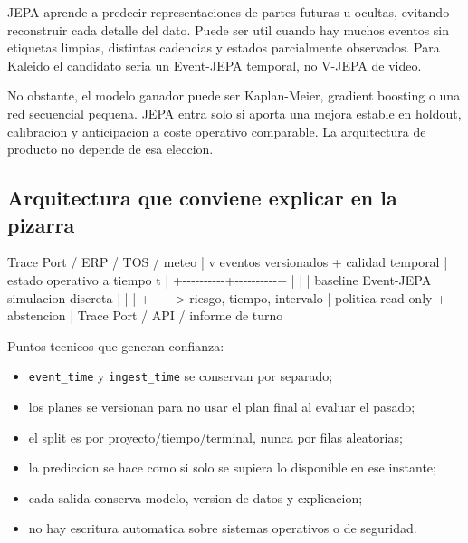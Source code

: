 \documentclass[
  spanish,
  10pt,
  a4paper,
]{article}
\newenvironment{Shaded}{}{}
\newcommand{\NormalTok}[1]{#1}
\providecommand{\tightlist}{%
  \setlength{\itemsep}{0pt}\setlength{\parskip}{0pt}}
\begin{document}
JEPA aprende a predecir representaciones de partes futuras u ocultas,
evitando reconstruir cada detalle del dato. Puede ser util cuando hay
muchos eventos sin etiquetas limpias, distintas cadencias y estados
parcialmente observados. Para Kaleido el candidato seria un Event-JEPA
temporal, no V-JEPA de video.

No obstante, el modelo ganador puede ser Kaplan-Meier, gradient boosting
o una red secuencial pequena. JEPA entra solo si aporta una mejora
estable en holdout, calibracion y anticipacion a coste operativo
comparable. La arquitectura de producto no depende de esa eleccion.

\subsection{Arquitectura que conviene explicar en la
pizarra}\label{arquitectura-que-conviene-explicar-en-la-pizarra}

\begin{Shaded}
\begin{Highlighting}[]
\NormalTok{Trace Port / ERP / TOS / meteo}
\NormalTok{              |}
\NormalTok{              v}
\NormalTok{     eventos versionados + calidad temporal}
\NormalTok{              |}
\NormalTok{       estado operativo a tiempo t}
\NormalTok{              |}
\NormalTok{   +{-}{-}{-}{-}{-}{-}{-}{-}{-}{-}+{-}{-}{-}{-}{-}{-}{-}{-}{-}{-}+}
\NormalTok{   |          |          |}
\NormalTok{baseline   Event{-}JEPA   simulacion discreta}
\NormalTok{   |          |          |}
\NormalTok{   +{-}{-}{-}{-}{-}{-}\textgreater{} riesgo, tiempo, intervalo}
\NormalTok{                    |}
\NormalTok{          politica read{-}only + abstencion}
\NormalTok{                    |}
\NormalTok{      Trace Port / API / informe de turno}
\end{Highlighting}
\end{Shaded}

Puntos tecnicos que generan confianza:

\begin{itemize}
\tightlist
\item
  \texttt{event\_time} y \texttt{ingest\_time} se conservan por
  separado;
\item
  los planes se versionan para no usar el plan final al evaluar el
  pasado;
\item
  el split es por proyecto/tiempo/terminal, nunca por filas aleatorias;
\item
  la prediccion se hace como si solo se supiera lo disponible en ese
  instante;
\item
  cada salida conserva modelo, version de datos y explicacion;
\item
  no hay escritura automatica sobre sistemas operativos o de seguridad.
\end{itemize}
\end{document}
